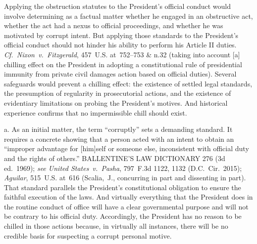 Applying the obstruction statutes to the President's official conduct would involve determining as a factual matter whether he engaged in an obstructive act, whether the act had a nexus to official proceedings, and whether he was motivated by corrupt intent.
But applying those standards to the President's official conduct should not hinder his ability to perform his Article II duties.
\textit{Cf.~Nixon~v.\ Fitzgerald}, 457~U.S. at~752--753 \& n.32 (taking into account [a] chilling effect on the President in adopting a constitutional rule of presidential immunity from private civil damages action based on official duties).
Several safeguards would prevent a chilling effect: the existence of settled legal standards, the presumption of regularity in prosecutorial actions, and the existence of evidentiary limitations on probing the President's motives.
And historical experience confirms that no impermissible chill should exist.

a. As an initial matter, the term ``corruptly'' sets a demanding standard.
It requires a concrete showing that a person acted with an intent to obtain an ``improper advantage for [him]self or someone else, inconsistent with official duty and the rights of others.'' BALLENTINE'S LAW DICTIONARY 276 (3d ed.~1969);
\textit{see United States~v.\ Pasha}, 797~F.3d 1122, 1132 (D.C.~Cir.~2015);
\textit{Aguilar}, 515~U.S. at~616 (Scalia,~J., concurring in part and dissenting in part).
That standard parallels the President's constitutional obligation to ensure the faithful execution of the laws.
And virtually everything that the President does in the routine conduct of office will have a clear governmental purpose and will not be contrary to his official duty.
Accordingly, the President has no reason to be chilled in those actions because, in virtually all instances, there will be no credible basis for suspecting a corrupt personal motive.


